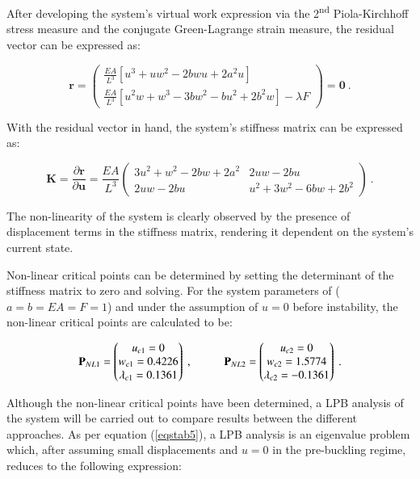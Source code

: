 After developing the system's virtual work expression via the 2\textsuperscript{nd} Piola-Kirchhoff stress measure and the conjugate Green-Lagrange strain measure, the residual vector can be expressed as:

\begin{equation} 
\mathbf{r} = 
\begin{pmatrix}
\frac{EA}{L^3} [u^3+uw^2-2bwu+2a^2u] \\
\frac{EA}{L^3} [u^2w + w^3 - 3bw^2 - bu^2 +2b^2w] - \lambda F
\end{pmatrix}
=
\mathbf{0}
\label{eqstab6}\ .
\end{equation}

With the residual vector in hand, the system's stiffness matrix can be expressed as:

\begin{equation} 
\mathbf{K} = 
\frac{\partial \mathbf{r}}{\partial \mathbf{u}}
=
\frac{EA}{L^3}
\begin{pmatrix}
3u^2 + w^2 - 2bw +2a^2 & 2uw -2bu \\
2uw - 2bu & u^2 + 3w^2 - 6bw + 2b^2
\end{pmatrix}
\label{eqstab7}\ .
\end{equation}

The non-linearity of the system is clearly observed by the presence of displacement terms in the stiffness matrix, rendering it dependent on the system's current state.

Non-linear critical points can be determined by setting the determinant of the stiffness matrix to zero and solving. For the system parameters of ($a=b=EA=F=1$) and under the assumption of $u = 0$ before instability, the non-linear critical points are calculated to be:

 \begin{equation} 
\mathbf{P}_{NL1} = 
 \begin{pmatrix}
 u_{c1} = 0 \\
w_{c1} = 0.4226 \\
\lambda_{c1} = 0.1361
 \end{pmatrix}
 \ ,
 \hspace{10mm}
 \mathbf{P}_{NL2} = 
 \begin{pmatrix}
 u_{c2} = 0 \\
 w_{c2} = 1.5774 \\
 \lambda_{c2} = -0.1361
 \end{pmatrix}
 \label{eqstab8}\ .
 \end{equation}
 
Although the non-linear critical points have been determined, a LPB analysis of the system will be carried out to compare results between the different approaches. As per equation (\ref{eqstab5}), a LPB analysis is an eigenvalue problem which, after assuming small displacements and $u=0$ in the pre-buckling regime, reduces to the following expression:

